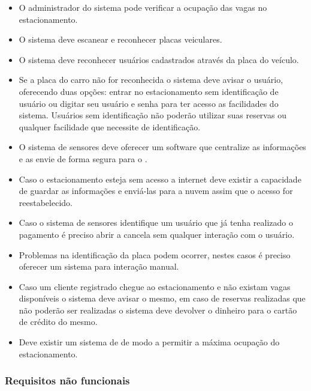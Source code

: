 \begin{itemize}
	\item O administrador do sistema pode verificar a ocupação das vagas no estacionamento.
	\item O sistema deve escanear e reconhecer placas veiculares.
	\item O sistema deve reconhecer usuários cadastrados através da placa do veículo.
	\item Se a placa do carro não for reconhecida o sistema deve avisar o usuário, oferecendo duas opções: entrar no estacionamento sem identificação de usuário ou digitar seu usuário e senha para ter acesso as facilidades do sistema. Usuários sem identificação não poderão utilizar suas reservas ou qualquer facilidade que necessite de identificação.
	\item O sistema de sensores deve oferecer um software que centralize as informações e as envie de forma segura para o \parkingWebAppName.
	\item Caso o estacionamento esteja sem acesso a internet deve existir a capacidade de guardar as informações e enviá-las para a nuvem assim que o acesso for reestabelecido.
	\item Caso o sistema de sensores identifique um usuário que já tenha realizado o pagamento é preciso abrir a cancela sem qualquer interação com o usuário.
	\item Problemas na identificação da placa podem ocorrer, nestes casos é preciso oferecer um sistema para interação manual.
	\item Caso um cliente registrado chegue ao estacionamento e não existam vagas disponíveis o sistema deve avisar o mesmo, em caso de reservas realizadas que não poderão ser realizadas o sistema deve devolver o dinheiro para o cartão de crédito do mesmo.
    \item Deve existir um sistema de  de modo a permitir a máxima ocupação do estacionamento.
\end{itemize}

\subsubsection{Requisitos não funcionais}




